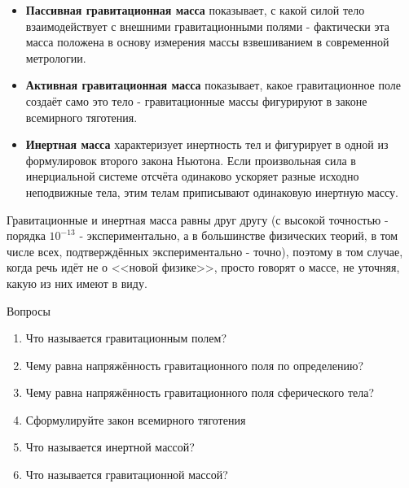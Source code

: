 \documentclass[a5paper, 10pt]{diss_4}
\renewcommand{\'}{\,'}
\begin{document}
\begin{itemize}

  \item \textbf{Пассивная гравитационная масса} показывает, с какой силой тело
взаимодействует с внешними гравитационными полями - фактически эта масса
положена в основу измерения массы взвешиванием в современной метрологии.

  \item \textbf{Активная гравитационная масса} показывает, какое гравитационное
поле создаёт само это тело - гравитационные массы фигурируют в законе
всемирного тяготения.

  \item \textbf{Инертная масса} характеризует инертность тел и фигурирует в
одной из формулировок второго закона Ньютона. Если произвольная сила в
инерциальной системе отсчёта одинаково ускоряет разные исходно неподвижные
тела, этим телам приписывают одинаковую инертную массу.

\end{itemize}

  Гравитационные и инертная масса равны друг другу (с высокой точностью -
порядка $10^{-13}$ - экспериментально, а в большинстве физических теорий, в том
числе всех, подтверждённых экспериментально - точно), поэтому в том случае,
когда речь идёт не о <<новой физике>>, просто говорят о массе, не уточняя, какую
из них имеют в виду.

\begin{center}
   Вопросы
\end{center}
\begin{enumerate}
\item Что называется гравитационным полем?
\item Чему равна напряжённость гравитационного поля по определению?
\item Чему равна напряжённость гравитационного поля сферического тела?
\item Сформулируйте закон всемирного тяготения
\item Что называется инертной массой?
\item Что называется гравитационной массой?
\end{enumerate}
\end{document}
